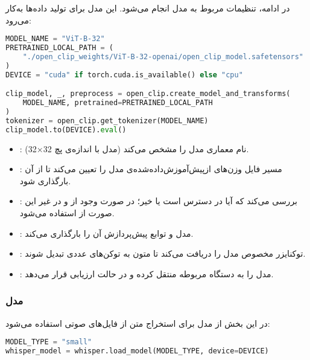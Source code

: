 \documentclass{article}
\begin{document}
در ادامه، تنظیمات مربوط به مدل  انجام می‌شود. این مدل برای تولید  داده‌ها به‌کار می‌رود:

\begin{latin}
\begin{lstlisting}[language=Python]
MODEL_NAME = "ViT-B-32"
PRETRAINED_LOCAL_PATH = (
    "./open_clip_weights/ViT-B-32-openai/open_clip_model.safetensors"
)
DEVICE = "cuda" if torch.cuda.is_available() else "cpu"

clip_model, _, preprocess = open_clip.create_model_and_transforms(
    MODEL_NAME, pretrained=PRETRAINED_LOCAL_PATH
)
tokenizer = open_clip.get_tokenizer(MODEL_NAME)
clip_model.to(DEVICE).eval()
\end{lstlisting}
\end{latin}

\begin{itemize}
\item {}: نام معماری مدل  را مشخص می‌کند (مدل  با اندازه‌ی پچ 32×32).
\item {}: مسیر فایل وزن‌های ازپیش‌آموزش‌داده‌شده‌ی مدل را تعیین می‌کند تا از آن بارگذاری شود.
\item {}: بررسی می‌کند که آیا  در دسترس است یا خیر؛ در صورت وجود از  و در غیر این صورت از  استفاده می‌شود.
\item {}: مدل  و توابع پیش‌پردازش آن را بارگذاری می‌کند.
\item {}: توکنایزر مخصوص مدل را دریافت می‌کند تا متون به توکن‌های عددی تبدیل شوند.
\item {}: مدل را به دستگاه مربوطه منتقل کرده و در حالت ارزیابی قرار می‌دهد.
\end{itemize}

\subsubsection{مدل }

در این بخش از مدل  برای استخراج متن از فایل‌های صوتی استفاده می‌شود:

\begin{latin}
\begin{lstlisting}[language=Python]
MODEL_TYPE = "small"
whisper_model = whisper.load_model(MODEL_TYPE, device=DEVICE)
\end{lstlisting}
\end{latin}
\end{document}
